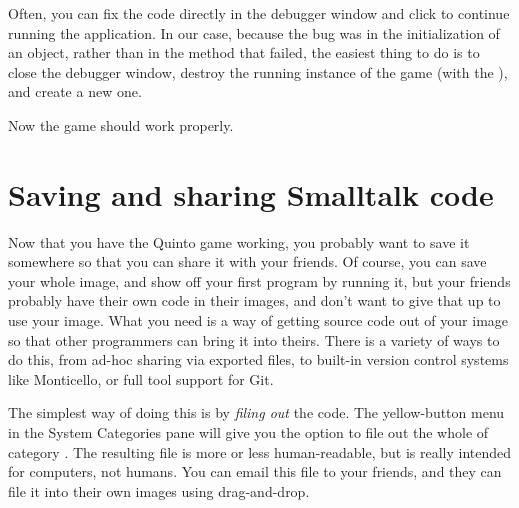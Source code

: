 \documentclass[a4paper,10pt,twoside]{book}
\begin{document}
\dothis{Close the debugger window.
	Add the expression ``\ct{^ cell}'' to the end of the method \ct{SBEGame>>>newCellAt:at:} so that it returns \ct{cell}.
	(See \mthref{newCellAt:at:nobug}.)}


Often, you can fix the code directly in the debugger window and click  to continue running the application.
In our case, because the bug was in the initialization of an object, rather than in the method that failed, the easiest thing to do is to close the debugger window, destroy the running instance of the game (with the ), and create a new one.

Now the game should work properly.

\section{Saving and sharing Smalltalk code}
\label{sec:Monticello}

Now that you have the Quinto game working, you probably want to save it somewhere so that you can share it with your friends.
Of course, you can save your whole \squeak image, and show off your first program by running it, but your friends probably have their own code in their images, and don't want to give that up to use your image.
What you need is a way of getting source code out of your \squeak image so that other programmers can bring it into theirs.
There is a variety of ways to do this, from ad-hoc sharing via exported files, to built-in version control systems like Monticello, or full tool support for Git.

The simplest way of doing this is by \emph{filing out} the code.
The yellow-button menu in the System Categories pane will give you the option to file out the whole of category .
The resulting file is more or less human-readable, but is really intended for computers, not humans.
You can email this file to your friends, and they can file it into their own \squeak images using drag-and-drop.
\end{document}
